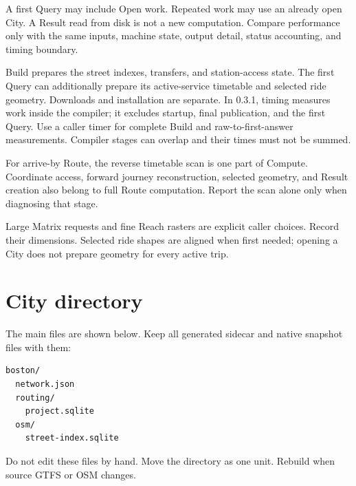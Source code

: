 \documentclass[10pt,letterpaper]{article}
\begin{document}
A first Query may include Open work. Repeated work may use an already open City. A Result read from disk is not a new computation. Compare performance only with the same inputs, machine state, output detail, status accounting, and timing boundary.

Build prepares the street indexes, transfers, and station-access state. The first Query can additionally prepare its active-service timetable and selected ride geometry. Downloads and installation are separate. In 0.3.1,  timing  measures work inside the compiler; it excludes startup, final publication, and the first Query. Use a caller timer for complete Build and raw-to-first-answer measurements. Compiler stages can overlap and their times must not be summed.

For arrive-by Route, the reverse timetable scan is one part of Compute. Coordinate access, forward journey reconstruction, selected geometry, and Result creation also belong to full Route computation. Report the scan alone only when diagnosing that stage.

Large Matrix requests and fine Reach rasters are explicit caller choices. Record their dimensions. Selected ride shapes are aligned when first needed; opening a City does not prepare geometry for every active trip.

\section{City directory}

The main files are shown below. Keep all generated sidecar and native snapshot files with them:

\begin{lstlisting}
boston/
  network.json
  routing/
    project.sqlite
  osm/
    street-index.sqlite
\end{lstlisting}

Do not edit these files by hand. Move the directory as one unit. Rebuild when source GTFS or OSM changes.
\end{document}
